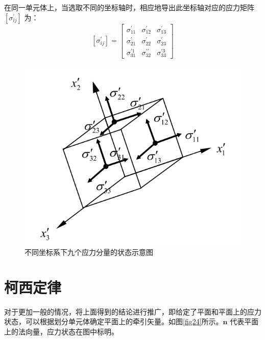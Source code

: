 \documentclass[12pt, a4paper]{ctexart}
\begin{document}
在同一单元体上，当选取不同的坐标轴时，相应地导出此坐标轴对应的应力矩阵 $ \left[\sigma_{i j}^{\prime}\right] $ 为：
\begin{equation}
\left[\sigma_{i j}^{\prime}\right]=\left[ \begin{array}{ccc}{\sigma_{11}^{\prime}} & {\sigma_{12}^{\prime}} & {\sigma_{13}^{\prime}} \\ {\sigma_{21}^{\prime}} & {\sigma_{22}^{\prime}} & {\sigma_{23}^{\prime}} \\ {\sigma_{31}^{\prime 1}} & {\sigma_{32}^{\prime \prime}} & {\sigma_{33}^{\prime 3}}\end{array}\right]
\end{equation}

\begin{figure}
	\centering
	\includegraphics[scale=0.8]{23.png}
	\caption{不同坐标系下九个应力分量的状态示意图}
	\label{fig23}
\end{figure}


\section{柯西定律}

对于更加一般的情况，将上面得到的结论进行推广，即给定了平面和平面上的应力状态，可以根据划分单元体确定平面上的牵引矢量。如图\ref{fig24}所示。$ \textbf{n} $ 代表平面上的法向量，应力状态在图中标明。\citep{auc}
\end{document}

